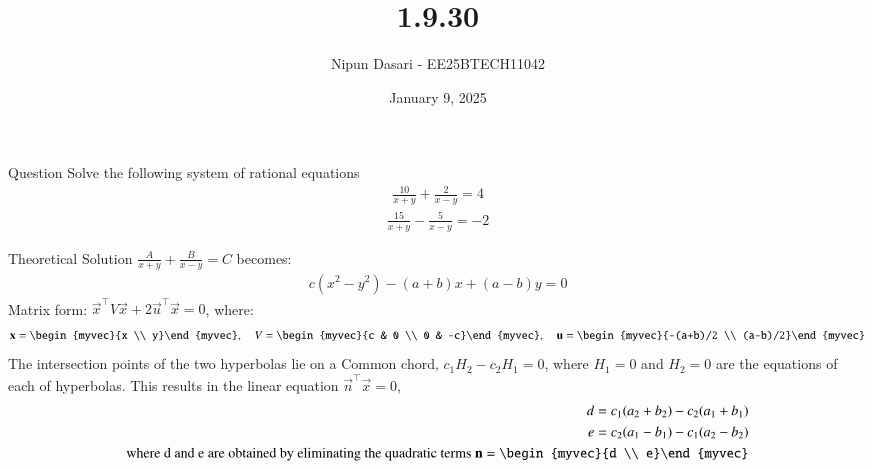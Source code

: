 \documentclass{beamer}
\title %
{1.9.30}
\date{January 9, 2025}
\author %
{Nipun Dasari - EE25BTECH11042}
\begin{document}
	
	\frame{\titlepage}
	\begin{frame}{Question}
	Solve the following system of rational equations
	\begin{align}
		\frac{10}{x+y}+\frac{2}{x-y} = 4
	\end{align}
	\begin{align}
		\frac{15}{x+y}-\frac{5}{x-y} = -2
	\end{align}
	
	\end{frame}
	
	
	\begin{frame}{Theoretical Solution}
	 $\frac{A}{x+y} + \frac{B}{x-y} = C$ becomes:
	\begin{align}
		c(x^2 - y^2) - (a+b)x + (a-b)y = 0 \label{eq:hyperbola_form}
	\end{align}
	Matrix form: $\vec{x}^\top V \vec{x} + 2\vec{u}^\top \vec{x} = 0$, where:
	\begin{align}
		\vec{x} = \begin{myvec}{x \\ y}\end{myvec}, \quad
		V = \begin{myvec}{c & 0 \\ 0 & -c}\end{myvec}, \quad
		\vec{u} = \begin{myvec}{-(a+b)/2 \\ (a-b)/2}\end{myvec} \label{eq:matrix_defs}
	\end{align}
	The intersection points of the two hyperbolas lie on a Common chord, $c_1H_2-c_2H_1=0$, where $H_1=0$ and $H_2=0$ are the equations of each of hyperbolas. This results in the linear equation $\vec{n}^\top\vec{x}=0$,
	\begin{align}
		d = c_1(a_2+b_2) - c_2(a_1+b_1) \label{eq:D_coeff} \\
		e = c_2(a_1-b_1) - c_1(a_2-b_2) \label{eq:E_coeff} \\
		\text{where d and e are obtained by eliminating the quadratic terms  } \vec{n} = \begin{myvec}{d \\ e}\end{myvec}
	\end{align}
	\end{frame}
\end{document}
